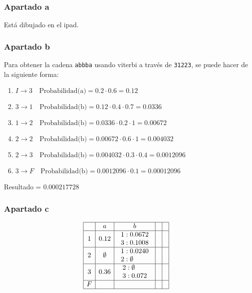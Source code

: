 \subsubsection{Apartado a}

Está dibujado en el ipad.

\subsubsection{Apartado b}

Para obtener la cadena \texttt{abbba} usando viterbi a través de \texttt{31223},
se puede hacer de la siguiente forma:

\begin{enumerate}
    \item $I \to 3 \quad \text{Probabilidad(a)} = 0.2 \cdot 0.6 = 0.12$
    \item $3 \to 1 \quad \text{Probabilidad(b)} = 0.12 \cdot 0.4 \cdot 0.7 = 0.0336$
    \item $1 \to 2 \quad \text{Probabilidad(b)} = 0.0336 \cdot 0.2 \cdot 1 = 0.00672$
    \item $2 \to 2 \quad \text{Probabilidad(b)} = 0.00672 \cdot 0.6 \cdot 1 = 0.004032$
    \item $2 \to 3 \quad \text{Probabilidad(b)} = 0.004032 \cdot 0.3 \cdot 0.4 = 0.0012096$
    \item $3 \to F \quad \text{Probabilidad(b)} = 0.0012096 \cdot 0.1 = 0.00012096$
\end{enumerate}

Resultado = $0.000217728$

\subsubsection{Apartado c}

\[
\begin{array}{|c|c|c|c|c|}
\hline
& a & b & & \\ \hline
1 & 0.12 & 
\begin{array}{l}
1: 0.0672 \\
3: 0.1008
\end{array} & & \\ \hline
2 & \emptyset & 
\begin{array}{l}
1: 0.0240 \\
2: \emptyset
\end{array} & & \\ \hline
3 & 0.36 & 
\begin{array}{l}
2: \emptyset \\
3: 0.072
\end{array} & & \\ \hline
F & & & & \\ \hline
\end{array}
\]


